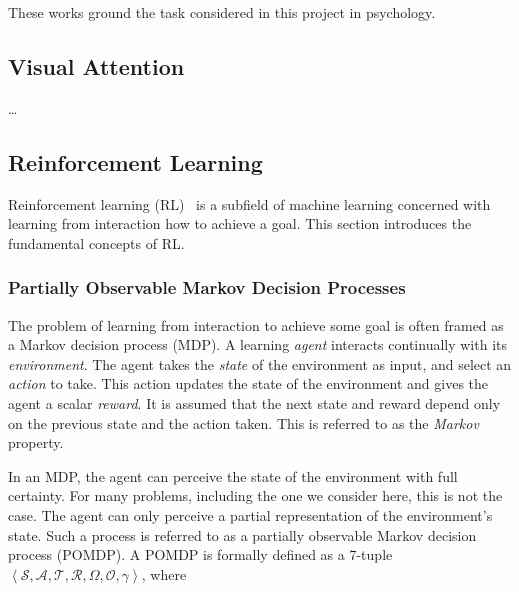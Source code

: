 These works ground the task considered in this project in psychology.


\subsection{Visual Attention}

\dots

\subsection{Reinforcement Learning}



Reinforcement learning (RL)~\cite{sutton_reinforcement_2018} is a subfield of machine learning concerned with learning from interaction how to achieve a goal.
This section introduces the fundamental concepts of RL.

\subsubsection{Partially Observable Markov Decision Processes}

The problem of learning from interaction to achieve some goal is often framed as a Markov decision process (MDP).
A learning \textit{agent} interacts continually with its \textit{environment}.
The agent takes the \textit{state} of the environment as input, and select an \textit{action} to take.
This action updates the state of the environment and gives the agent a scalar \textit{reward}.
It is assumed that the next state and reward depend only on the previous state and the action taken.
This is referred to as the \textit{Markov} property.~\cite{kaelbling_pomdp_1998}

In an MDP, the agent can perceive the state of the environment with full certainty.
For many problems, including the one we consider here, this is not the case.
The agent can only perceive a partial representation of the environment's state.
Such a process is referred to as a partially observable Markov decision process (POMDP).
A POMDP is formally defined as a 7-tuple \(\left\langle \mathcal{S}, \mathcal{A}, \mathcal{T}, \mathcal{R}, \Omega, \mathcal{O}, \gamma \right\rangle\), where

